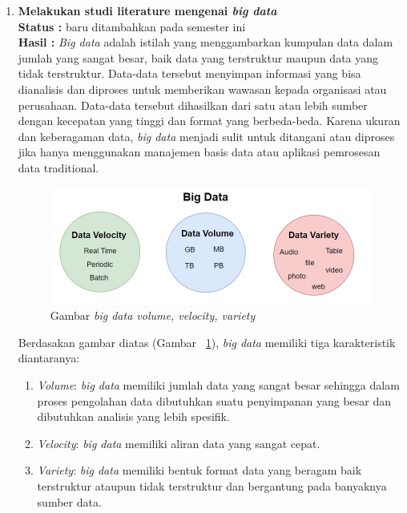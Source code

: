\documentclass[a4paper,twoside]{article}
\begin{document}
	\begin{enumerate}
	
		\item \textbf{Melakukan studi literature mengenai \textit{big data}}\\
		{\bf Status :} baru ditambahkan pada semester ini\\
		{\bf Hasil :} {\it Big data} adalah istilah yang menggambarkan kumpulan data dalam jumlah yang sangat besar, baik data yang terstruktur maupun data yang tidak terstruktur. Data-data tersebut menyimpan informasi yang bisa dianalisis dan diproses untuk memberikan wawasan kepada organisasi atau perusahaan. Data-data tersebut dihasilkan dari satu atau lebih sumber  dengan kecepatan yang tinggi dan format yang berbeda-beda. Karena ukuran dan keberagaman data, {\it big data} menjadi sulit untuk ditangani atau diproses jika hanya menggunakan manajemen basis data atau aplikasi pemrosesan data traditional.\\


\begin{figure}[H]
    \centering  
    \includegraphics[scale=0.7]{bigdata}  
    \caption[Gambar {\it big data volume, velocity, variety} ]{Gambar {\it big data volume, velocity, variety}} 
    \label{fig:bigdata} 
\end{figure}

Berdasakan gambar diatas (Gambar ~\ref{fig:bigdata}), \textit{big data} memiliki tiga karakteristik diantaranya:

\begin{enumerate}

\item {\it Volume}: {\it big data} memiliki jumlah data yang sangat besar sehingga dalam proses pengolahan data dibutuhkan suatu penyimpanan yang besar dan dibutuhkan analisis yang lebih spesifik.

\item {\it Velocity}: {\it big data} memiliki aliran data yang sangat cepat.

\item {\it Variety}: {\it big data} memiliki bentuk format data yang beragam baik terstruktur ataupun tidak terstruktur dan bergantung pada banyaknya sumber data.


\end{enumerate}
\end{enumerate}
\end{document}
